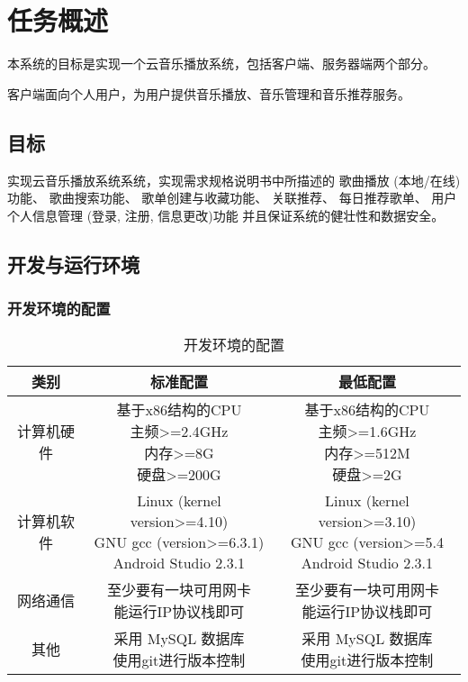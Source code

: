 \chapter{任务概述}
本系统的目标是实现一个云音乐播放系统，包括客户端、服务器端两个部分。

客户端面向个人用户，为用户提供音乐播放、音乐管理和音乐推荐服务。

\section{目标}
实现云音乐播放系统系统，实现需求规格说明书中所描述的
歌曲播放 (本地/在线)功能、
歌曲搜索功能、
歌单创建与收藏功能、
关联推荐、
每日推荐歌单、
用户个人信息管理 (登录, 注册, 信息更改)功能
并且保证系统的健壮性和数据安全。

\section{开发与运行环境}

\subsection{开发环境的配置}
\begin{table}[htbp]
	\centering
	\caption{开发环境的配置} \label{tab:development-environment}
	\begin{tabular}{|c|c|c|}
		\hline
		类别 & 标准配置 & 最低配置 \\
		\hline
		计算机硬件 & \tabincell{c}{基于x86结构的CPU\\ 主频>=2.4GHz\\ 内存>=8G\\ 硬盘>=200G } & \tabincell{c}{基于x86结构的CPU\\ 主频>=1.6GHz\\ 内存>=512M\\ 硬盘>=2G} \\
		\hline
		计算机软件 & \tabincell{c}{Linux (kernel version>=4.10)\\ GNU gcc (version>=6.3.1)\\Android Studio 2.3.1 } & \tabincell{c}{Linux (kernel version>=3.10)\\ GNU gcc (version>=5.4\\Android Studio 2.3.1} \\
		\hline
		网络通信 & \tabincell{c}{至少要有一块可用网卡\\ 能运行IP协议栈即可} & \tabincell{c}{至少要有一块可用网卡\\ 能运行IP协议栈即可} \\
		\hline
		其他 & \tabincell{c}{采用 MySQL 数据库\\ 使用git进行版本控制} & \tabincell{c}{采用 MySQL 数据库\\ 使用git进行版本控制} \\
		\hline
	\end{tabular}
\end{table}

